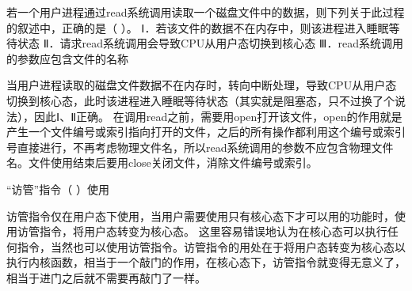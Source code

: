 \question 若一个用户进程通过read系统调用读取一个磁盘文件中的数据，则下列关于此过程的叙述中，正确的是（
）。 Ⅰ．若该文件的数据不在内存中，则该进程进入睡眠等待状态
Ⅱ．请求read系统调用会导致CPU从用户态切换到核心态
Ⅲ．read系统调用的参数应包含文件的名称
\par{}
\begin{solution}当用户进程读取的磁盘文件数据不在内存时，转向中断处理，导致CPU从用户态切换到核心态，此时该进程进入睡眠等待状态（其实就是阻塞态，只不过换了个说法），因此Ⅰ、Ⅱ正确。
在调用read之前，需要用open打开该文件，open的作用就是产生一个文件编号或索引指向打开的文件，之后的所有操作都利用这个编号或索引号直接进行，不再考虑物理文件名，所以read系统调用的参数不应包含物理文件名。文件使用结束后要用close关闭文件，消除文件编号或索引。
\end{solution}
\question ``访管''指令（ ）使用
\par{}
\begin{solution}访管指令仅在用户态下使用，当用户需要使用只有核心态下才可以用的功能时，使用访管指令，将用户态转变为核心态。
这里容易错误地认为在核心态可以执行任何指令，当然也可以使用访管指令。访管指令的用处在于将用户态转变为核心态以执行内核函数，相当于一个敲门的作用，在核心态下，访管指令就变得无意义了，相当于进门之后就不需要再敲门了一样。
\end{solution}
